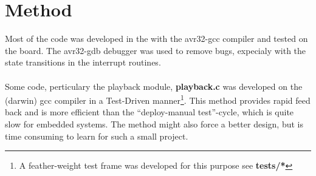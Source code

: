 \section{Method}
Most of the code was developed in the with the avr32-gcc compiler and tested on the board. The avr32-gdb debugger was
used to remove bugs, expecialy with the state transitions in the interrupt routines.\\
\\
Some code, perticulary the playback module, \textbf{playback.c} was developed on the (darwin) gcc compiler in a Test-Driven manner\footnote{A feather-weight test frame was developed for this purpose see \textbf{tests/*}}.
This method provides rapid feed back and is more efficient than the ``deploy-manual test''-cycle, which is quite slow for embedded systems.
The method might also force a better design, but is time consuming to learn for such a small project.
